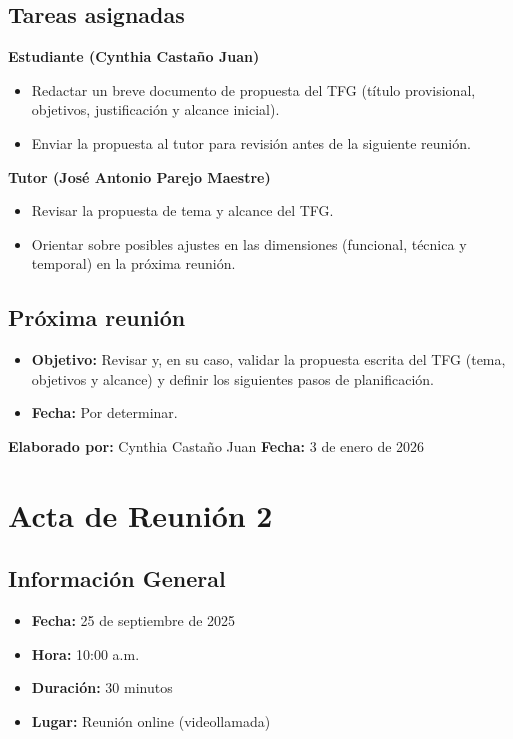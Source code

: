 \subsection*{Tareas asignadas}

\textbf{Estudiante (Cynthia Castaño Juan)}
\begin{itemize}
    \item Redactar un breve documento de propuesta del TFG (título provisional, objetivos, justificación y alcance inicial).
    \item Enviar la propuesta al tutor para revisión antes de la siguiente reunión.
\end{itemize}

\textbf{Tutor (José Antonio Parejo Maestre)}
\begin{itemize}
    \item Revisar la propuesta de tema y alcance del TFG.
    \item Orientar sobre posibles ajustes en las dimensiones (funcional, técnica y temporal) en la próxima reunión.
\end{itemize}

\subsection*{Próxima reunión}
\begin{itemize}
    \item \textbf{Objetivo:} Revisar y, en su caso, validar la propuesta escrita del TFG (tema, objetivos y alcance) y definir los siguientes pasos de planificación.
    \item \textbf{Fecha:} Por determinar.
\end{itemize}

\textbf{Elaborado por:} Cynthia Castaño Juan \hfill \textbf{Fecha:} 3 de enero de 2026

\newpage

\section*{Acta de Reunión 2}

\subsection*{Información General}
\begin{itemize}
    \item \textbf{Fecha:} 25 de septiembre de 2025
    \item \textbf{Hora:} 10:00 a.m.
    \item \textbf{Duración:} 30 minutos
    \item \textbf{Lugar:} Reunión online (videollamada)
\end{itemize}

